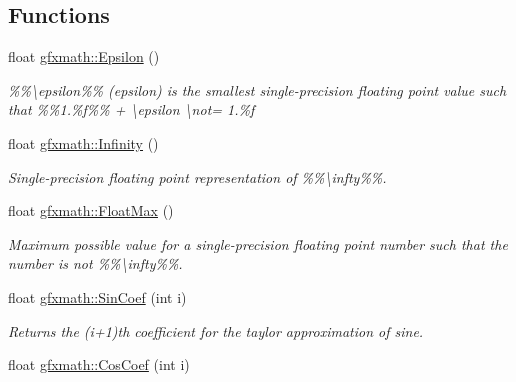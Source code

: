 \subsection*{Functions}
\begin{DoxyCompactItemize}
\item 
\hypertarget{group___scalar_math_consts_gafaec804c6b9d6173f5c1fc07ae7fda13}{}float \hyperlink{group___scalar_math_consts_gafaec804c6b9d6173f5c1fc07ae7fda13}{gfxmath\+::\+Epsilon} ()\label{group___scalar_math_consts_gafaec804c6b9d6173f5c1fc07ae7fda13}

\begin{DoxyCompactList}\small\item\em \%\%\textbackslash{}epsilon\%\% (epsilon) is the smallest single-\/precision floating point value such that \%\%1.\%f\%\% + \textbackslash{}epsilon \textbackslash{}not= 1.\%f \end{DoxyCompactList}\item 
\hypertarget{group___scalar_math_consts_gaf3d71b863bc7ac057d0928590246578e}{}float \hyperlink{group___scalar_math_consts_gaf3d71b863bc7ac057d0928590246578e}{gfxmath\+::\+Infinity} ()\label{group___scalar_math_consts_gaf3d71b863bc7ac057d0928590246578e}

\begin{DoxyCompactList}\small\item\em Single-\/precision floating point representation of \%\%\textbackslash{}infty\%\%. \end{DoxyCompactList}\item 
\hypertarget{group___scalar_math_consts_ga992fb71755b0697662cf03672daf4b1f}{}float \hyperlink{group___scalar_math_consts_ga992fb71755b0697662cf03672daf4b1f}{gfxmath\+::\+Float\+Max} ()\label{group___scalar_math_consts_ga992fb71755b0697662cf03672daf4b1f}

\begin{DoxyCompactList}\small\item\em Maximum possible value for a single-\/precision floating point number such that the number is not \%\%\textbackslash{}infty\%\%. \end{DoxyCompactList}\item 
\hypertarget{group___scalar_math_consts_ga84de592aedd66fb57593a14b25555f2f}{}float \hyperlink{group___scalar_math_consts_ga84de592aedd66fb57593a14b25555f2f}{gfxmath\+::\+Sin\+Coef} (int i)\label{group___scalar_math_consts_ga84de592aedd66fb57593a14b25555f2f}

\begin{DoxyCompactList}\small\item\em Returns the (i+1)th coefficient for the taylor approximation of sine. \end{DoxyCompactList}\item 
\hypertarget{group___scalar_math_consts_gaa3c80693c5730cf478e5d98f73e6a72c}{}float \hyperlink{group___scalar_math_consts_gaa3c80693c5730cf478e5d98f73e6a72c}{gfxmath\+::\+Cos\+Coef} (int i)\label{group___scalar_math_consts_gaa3c80693c5730cf478e5d98f73e6a72c}


\end{DoxyCompactItemize}
